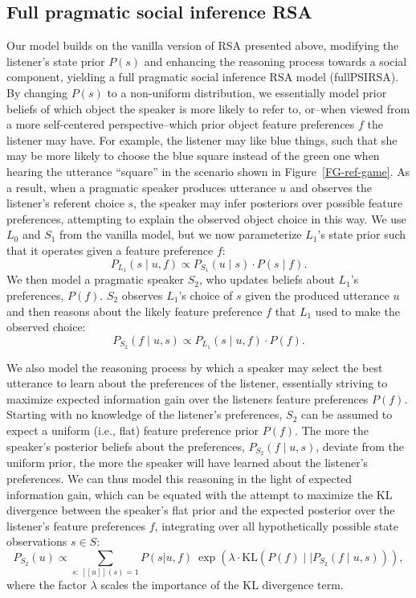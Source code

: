 \documentclass[10pt,a4paper]{article}
\newcommand{\gcs}[1]{\textcolor{blue}{[gcs: #1]}}
\begin{document}
\subsection{Full pragmatic social inference RSA}

Our model builds on the vanilla version of RSA presented above, modifying the listener's state prior $P(s)$ and enhancing the reasoning process towards a social component, yielding a full pragmatic social inference RSA model (fullPSIRSA). %
By changing $P(s)$ to a non-uniform distribution, we essentially model prior beliefs of which object the speaker is more likely to refer to, or--when viewed from a more self-centered perspective--which prior object feature preferences $f$ the listener may have. 
For example, the listener may like blue things, such that she may be more likely to choose the blue square instead of the green one when hearing the utterance ``square'' in the scenario shown in Figure~\ref{FG-ref-game}.
As a result, when a pragmatic speaker produces utterance $u$ and observes the listener's referent choice $s$, the speaker may infer posteriors over possible feature preferences, attempting to explain the observed object choice in this way.
We use $L_0$ and $S_1$ from the vanilla model, but we now parameterize $L_1$'s state prior such that it operates given a feature preference $f$:
$$P_{L_{1}}(s\mid u,f) \propto P_{S_{1}}(u \mid s) \cdot P(s \mid f).$$
We then model a pragmatic speaker $S_2$, who updates beliefs about $L_1$'s preferences, $P(f)$.
$S_2$ observes $L_1$'s choice of $s$ given the produced utterance $u$ and then reasons about the likely feature preference $f$ that $L_1$ used to make the observed choice:
$$P_{S_{2}}(f\mid u,s) \propto P_{L_{1}}(s \mid u,f) \cdot P(f).$$

We also model the reasoning process by which a speaker may select the best utterance to learn about the preferences of the listener, essentially striving to maximize expected information gain over the listeners feature preferences $P(f)$.
Starting with no knowledge of the listener's preferences, $S_2$ can be assumed to expect a uniform (i.e., flat) feature preference prior $P(f)$.
The more the speaker's posterior beliefs about the preferences, $P_{S_{2}}(f\mid u,s)$, deviate from the uniform prior, the more the speaker will have learned about the listener's preferences. 
We can thus model this reasoning in the light of expected information gain, which can be equated with the attempt to maximize the KL divergence between the speaker's flat prior and the expected posterior over the listener's feature preferences $f$, integrating over all hypothetically possible state observations $s \in S$: %
$$P_{S_2}(u) \propto \sum_{s:\  [\![u]\!](s)=1} P(s|u,f)\ \exp(\lambda \cdot \textrm{KL}(P(f)\mid\mid P_{S_{2}}(f\mid u,s))),$$
where the factor $\lambda$ scales the importance of the KL divergence term. 
\end{document}
